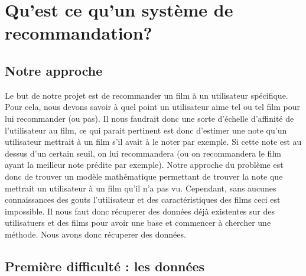 \documentclass[a4paper,10pt]{article}
\title{}
\author{}
\begin{document}
\maketitle

\begin{abstract}
\end{abstract}

\section{Qu'est ce qu'un système de recommandation?}

\subsection{Notre approche}
Le but de notre projet est de recommander un film à un utilisateur spécifique. 
Pour cela, nous devons savoir à quel point un utilisateur aime tel ou tel film pour lui recommander (ou pas). 
Il nous faudrait donc une sorte d'échelle d'affinité de l'utilisateur au film, ce qui parait pertinent est donc d'estimer une note qu'un utilisateur mettrait à un film s'il avait à le noter par exemple. 
Si cette note est au dessus d'un certain seuil, on lui recommandera (ou on recommandera le film ayant la meilleur note prédite par exemple). 
Notre approche du problème est donc de trouver un modèle mathématique permettant de trouver la note que mettrait un utilisateur à un film qu'il n'a pas vu. 
Cependant, sans aucunes connaissances des gouts l'utilisateur et des caractéristiques des films ceci est impossible. 
Il nous faut donc récuperer des données déjà existentes sur des utilisatuers et des films pour avoir une base et commencer à chercher une méthode.  
Nous avons donc récuperer des données.

\subsection{Première difficulté : les données}
\end{document}
